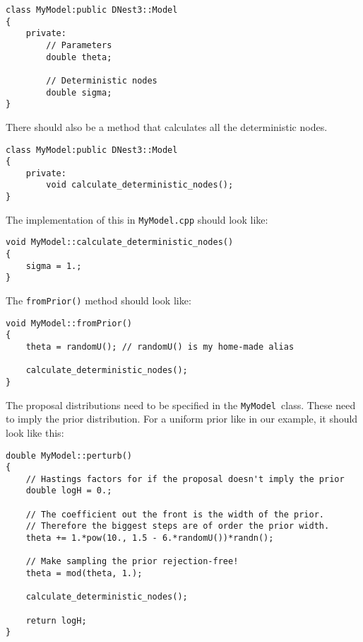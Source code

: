 \documentclass[letterpaper, 11pt]{article}
\newcommand{\mymodel}{{\tt MyModel}}
\begin{document}
\begin{verbatim}
class MyModel:public DNest3::Model
{
    private:
        // Parameters
        double theta;

        // Deterministic nodes
        double sigma;
}
\end{verbatim}

There should also be a method that calculates all the deterministic nodes.
\begin{verbatim}
class MyModel:public DNest3::Model
{
    private:
        void calculate_deterministic_nodes();
}
\end{verbatim}
The implementation of this in \mymodel{\tt.cpp} should look like:
\begin{verbatim}
void MyModel::calculate_deterministic_nodes()
{
    sigma = 1.;
}
\end{verbatim}
The {\tt fromPrior()} method should look like:
\begin{verbatim}
void MyModel::fromPrior()
{
    theta = randomU(); // randomU() is my home-made alias

    calculate_deterministic_nodes();
}
\end{verbatim}
The proposal distributions need to be specified in the \mymodel~class.
These need to imply the prior distribution. For a uniform prior like in our
example, it should look like this:
\begin{verbatim}
double MyModel::perturb()
{
    // Hastings factors for if the proposal doesn't imply the prior
    double logH = 0.;

    // The coefficient out the front is the width of the prior.
    // Therefore the biggest steps are of order the prior width.
    theta += 1.*pow(10., 1.5 - 6.*randomU())*randn();

    // Make sampling the prior rejection-free!
    theta = mod(theta, 1.);

    calculate_deterministic_nodes();

    return logH;
}
\end{verbatim}
\end{document}
